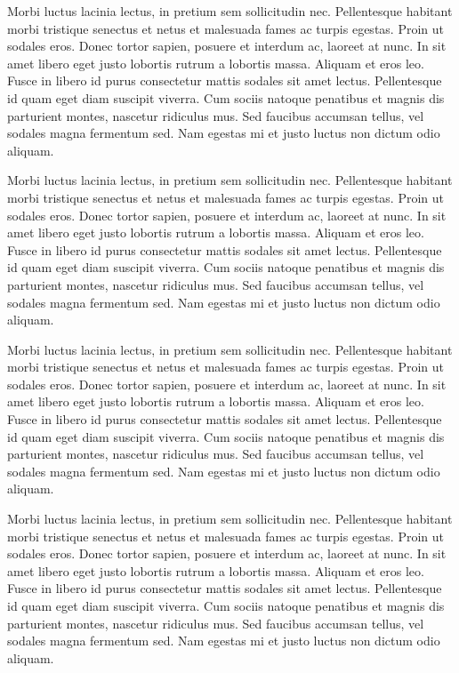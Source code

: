 {\narrower

\startrule
Morbi luctus lacinia lectus, in pretium sem sollicitudin
nec. Pellentesque habitant morbi tristique senectus et netus et
malesuada fames ac turpis egestas. Proin ut sodales eros. Donec tortor
sapien, posuere et interdum ac, laoreet at nunc. In sit amet libero
eget justo lobortis rutrum a lobortis massa. Aliquam et eros
leo. Fusce in libero id purus consectetur mattis sodales sit amet
lectus. Pellentesque id quam eget diam suscipit viverra. Cum sociis
natoque penatibus et magnis dis parturient montes, nascetur ridiculus
mus. Sed faucibus accumsan tellus, vel sodales magna fermentum
sed. Nam egestas mi et justo luctus non dictum odio aliquam.

Morbi luctus lacinia lectus, in pretium sem sollicitudin
nec. Pellentesque habitant morbi tristique senectus et netus et
malesuada fames ac turpis egestas. Proin ut sodales eros. Donec tortor
sapien, posuere et interdum ac, laoreet at nunc. In sit amet libero
eget justo lobortis rutrum a lobortis massa. Aliquam et eros
leo. Fusce in libero id purus consectetur mattis sodales sit amet
lectus. Pellentesque id quam eget diam suscipit viverra. Cum sociis
natoque penatibus et magnis dis parturient montes, nascetur ridiculus
mus. Sed faucibus accumsan tellus, vel sodales magna fermentum
sed. Nam egestas mi et justo luctus non dictum odio aliquam.

Morbi luctus lacinia lectus, in pretium sem sollicitudin
nec. Pellentesque habitant morbi tristique senectus et netus et
malesuada fames ac turpis egestas. Proin ut sodales eros. Donec tortor
sapien, posuere et interdum ac, laoreet at nunc. In sit amet libero
eget justo lobortis rutrum a lobortis massa. Aliquam et eros
leo. Fusce in libero id purus consectetur mattis sodales sit amet
lectus. Pellentesque id quam eget diam suscipit viverra. Cum sociis
natoque penatibus et magnis dis parturient montes, nascetur ridiculus
mus. Sed faucibus accumsan tellus, vel sodales magna fermentum
sed. Nam egestas mi et justo luctus non dictum odio aliquam.

Morbi luctus lacinia lectus, in pretium sem sollicitudin
nec. Pellentesque habitant morbi tristique senectus et netus et
malesuada fames ac turpis egestas. Proin ut sodales eros. Donec tortor
sapien, posuere et interdum ac, laoreet at nunc. In sit amet libero
eget justo lobortis rutrum a lobortis massa. Aliquam et eros
leo. Fusce in libero id purus consectetur mattis sodales sit amet
lectus. Pellentesque id quam eget diam suscipit viverra. Cum sociis
natoque penatibus et magnis dis parturient montes, nascetur ridiculus
mus. Sed faucibus accumsan tellus, vel sodales magna fermentum
sed. Nam egestas mi et justo luctus non dictum odio aliquam.

\endrule

}
